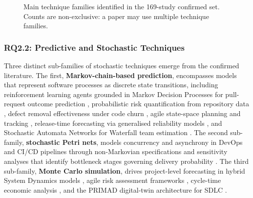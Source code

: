 \begin{figure}[tbp]
\centering
{}
\caption{Main technique families identified in the 169-study confirmed set.
Counts are non-exclusive: a paper may use multiple technique families.}
\label{fig:pdf-technique-dist}
\end{figure}

\subsubsection{RQ2.2: Predictive and Stochastic Techniques}

Three distinct sub-families of stochastic techniques emerge from the confirmed
literature. The first, \textbf{Markov-chain-based prediction}, encompasses
models that represent software processes as discrete state transitions, including
reinforcement learning agents grounded in Markov Decision Processes for
pull-request outcome prediction \cite{joshi2024}, probabilistic risk
quantification from repository data \cite{jeon2015}, defect removal
effectiveness under code churn \cite{tian2005}, agile state-space planning and
tracking \cite{tyagi2021}, release-time forecasting via generalised reliability
models \cite{washizaki2015}, and Stochastic Automata Networks for Waterfall team
estimation \cite{massitela2018}. The second sub-family, \textbf{stochastic
Petri nets}, models concurrency and asynchrony in DevOps and CI/CD pipelines
through non-Markovian specifications \cite{benmesmia2021} and sensitivity
analyses that identify bottleneck stages governing delivery probability
\cite{bhadra2022,bhadra2023}. The third sub-family, \textbf{Monte Carlo
simulation}, drives project-level forecasting in hybrid System Dynamics models
\cite{li2020}, agile risk assessment frameworks \cite{lunesu2021}, cycle-time
economic analysis \cite{magennis2015}, and the PRIMAD digital-twin architecture
for SDLC \cite{guinea2025}.

